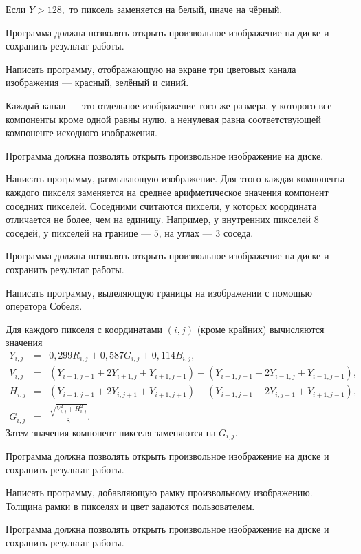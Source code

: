 Если $Y > 128,$ то пиксель заменяется на белый, иначе на чёрный.

Программа должна позволять открыть произвольное изображение на диске и
сохранить результат работы.

\task Написать программу, отображающую на экране три цветовых канала
изображения — красный, зелёный и синий.

Каждый канал — это отдельное изображение того же размера, у которого
все компоненты кроме одной равны нулю, а ненулевая равна
соответствующей компоненте исходного изображения.

Программа должна позволять открыть произвольное изображение на диске.

\task Написать программу, размывающую
изображение. Для этого каждая компонента
каждого пикселя заменяется на среднее арифметическое значения
компонент соседних пикселей. Соседними считаются пиксели, у которых
координата отличается не более, чем на единицу. Например, у внутренних
пикселей $8$ соседей, у пикселей на границе — $5$, на углах — $3$
соседа.

Программа должна позволять открыть произвольное изображение на диске и
сохранить результат работы.

\task Написать программу, выделяющую границы на изображении с помощью
оператора Собеля.

Для каждого пикселя с координатами $(i,j)$ (кроме крайних) вычисляются
значения
\begin{eqnarray*}
Y_{i,j} &=& 0{,}299 R_{i,j} + 0{,}587 G_{i,j} + 0{,}114 B_{i,j},\\
V_{i,j} &=& (Y_{i+1,j-1} + 2 Y_{i+1,j} + Y_{i+1,j-1}) - (Y_{i-1,j-1} + 2 Y_{i-1,j} + Y_{i-1,j-1}),\\
H_{i,j} &=& (Y_{i-1,j+1} + 2 Y_{i,j+1} + Y_{i+1,j+1}) - (Y_{i-1,j-1} + 2 Y_{i,j-1} + Y_{i+1,j-1}),\\
G_{i,j} &=& \frac{\sqrt{V_{i,j}^2+H_{i,j}^2}}{8}.
\end{eqnarray*}
Затем значения компонент пикселя заменяются на $G_{i,j}.$

Программа должна позволять открыть произвольное изображение на диске и
сохранить результат работы.

\task Написать программу, добавляющую рамку произвольному
изображению. Толщина рамки в пикселях и цвет задаются пользователем.

Программа должна позволять открыть произвольное изображение на диске и
сохранить результат работы.

